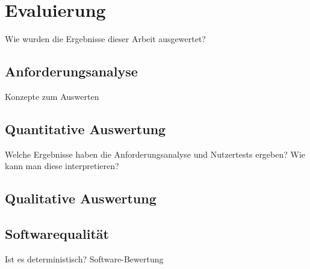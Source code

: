 \chapter{Evaluierung} %
Wie wurden die Ergebnisse dieser Arbeit ausgewertet?

\section{Anforderungsanalyse} %
Konzepte zum Auswerten 

\section{Quantitative Auswertung}\label{sec:quanti-auswertung} %
Welche Ergebnisse haben die Anforderungsanalyse und Nutzertests ergeben? Wie kann man diese interpretieren? 

\section{Qualitative Auswertung}

\section{Softwarequalität}
Ist es deterministisch? Software-Bewertung